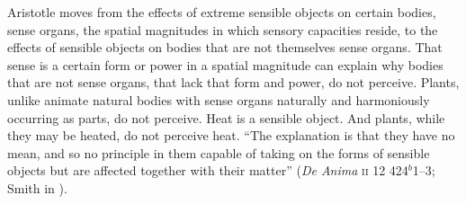 Aristotle moves from the effects of extreme sensible objects on certain bodies, sense organs, the spatial magnitudes in which sensory capacities reside, to the effects of sensible objects on bodies that are not themselves sense organs. That sense is a certain form or power in a spatial magnitude can explain why bodies that are not sense organs, that lack that form and power, do not perceive. Plants, unlike animate natural bodies with sense organs naturally and harmoniously occurring as parts, do not perceive. Heat is a sensible object. And plants, while they may be heated, do not perceive heat. ``The explanation is that they have no mean, and so no principle in them capable of taking on the forms of sensible objects but are affected together with their matter'' (\emph{De Anima} \textsc{ii} 12 424\( ^{b} \)1--3; Smith in \citealt[43]{Barnes:1984uq}). 

